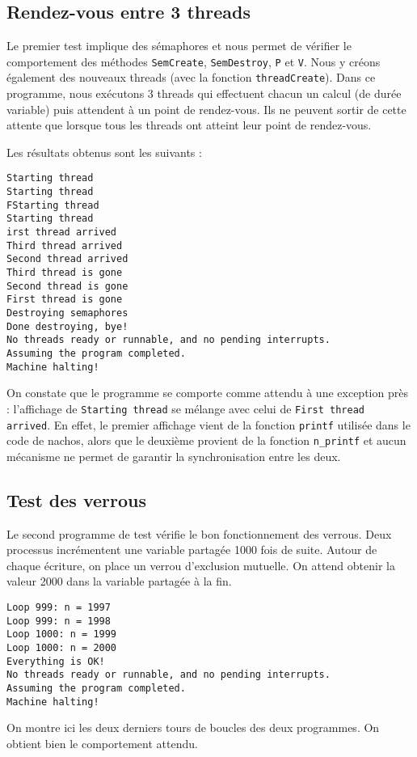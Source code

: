 \documentclass{article}
\def\fun#1{\texttt{#1}}
\begin{document}
\subsection{Rendez-vous entre 3 threads}
Le premier test implique des sémaphores et nous permet de vérifier le comportement des méthodes \fun{SemCreate}, \fun{SemDestroy}, \fun{P} et \fun{V}. Nous y créons également des nouveaux threads (avec la fonction \fun{threadCreate}). Dans ce programme, nous exécutons 3 threads qui effectuent chacun un calcul (de durée variable) puis attendent à un point de rendez-vous. Ils ne peuvent sortir de cette attente que lorsque  tous les threads ont atteint leur point de rendez-vous.

Les résultats obtenus sont les suivants :
\begin{lstlisting}
Starting thread
Starting thread
FStarting thread
Starting thread
irst thread arrived
Third thread arrived
Second thread arrived
Third thread is gone
Second thread is gone
First thread is gone
Destroying semaphores
Done destroying, bye!
No threads ready or runnable, and no pending interrupts.
Assuming the program completed.
Machine halting!
\end{lstlisting}

On constate que le programme se comporte comme attendu à une exception près : l'affichage de \texttt{Starting thread} se mélange avec celui de \texttt{First thread arrived}. En effet, le premier affichage vient de la fonction \fun{printf} utilisée dans le code de nachos, alors que le deuxième provient de la fonction \fun{n\_printf} et aucun mécanisme ne permet de garantir la synchronisation entre les deux.

\subsection{Test des verrous}
Le second programme de test vérifie le bon fonctionnement des verrous. Deux processus incrémentent une variable partagée 1000 fois de suite. Autour de chaque écriture, on place un verrou d'exclusion mutuelle. On attend obtenir la valeur 2000 dans la variable partagée à la fin.

\begin{lstlisting}
Loop 999: n = 1997
Loop 999: n = 1998
Loop 1000: n = 1999
Loop 1000: n = 2000
Everything is OK!
No threads ready or runnable, and no pending interrupts.
Assuming the program completed.
Machine halting!
\end{lstlisting}

On montre ici les deux derniers tours de boucles des deux programmes. On obtient bien le comportement attendu.
\end{document}
